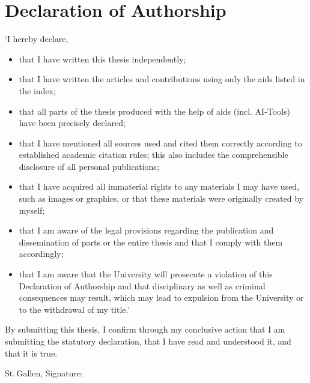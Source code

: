 
\chapter*{Declaration of Authorship}

`I hereby declare,

\begin{itemize}
    \item that I have written this thesis independently;
    \item that I have written the articles and contributions using only the aids listed in the index;
    \item that all parts of the thesis produced with the help of aids (incl. AI-Tools) have been precisely declared;
    \item that I have mentioned all sources used and cited them correctly according to established academic citation rules; this also includes the comprehensible disclosure of all personal publications;
    \item that I have acquired all immaterial rights to any materials I may have used, such as images or graphics, or that these materials were originally created by myself;
    \item that I am aware of the legal provisions regarding the publication and dissemination of parts or the entire thesis and that I comply with them accordingly;
    \item that I am aware that the University will prosecute a violation of this Declaration of Authorship and that disciplinary as well as criminal consequences may result, which may lead to expulsion from the University or to the withdrawal of my title.'
\end{itemize}

\noindent
By submitting this thesis, I confirm through my conclusive action that I am submitting the statutory declaration, that I have read and understood it, and that it is true.

\vspace{15mm}
\noindent
St.\,Gallen,
\makeatletter
\@submissiondate{}
\makeatother
\hspace{.2\linewidth} Signature: